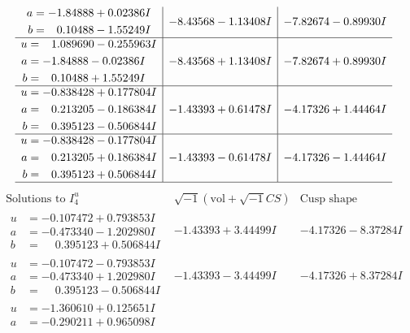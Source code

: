 \documentclass[1p]{elsarticle_modified}
\theoremstyle{definition}
\newcommand{\I}{\sqrt{-1}}
\begin{document}
$$\begin{array}{c|c|c}
\begin{aligned}
a &= -1.84888 + 0.02386 I \\
b &= \phantom{-}0.10488 - 1.55249 I\end{aligned}
 & -8.43568 - 1.13408 I & -7.82674 - 0.89930 I \\ \hline\begin{aligned}
u &= \phantom{-}1.089690 - 0.255963 I \\
a &= -1.84888 - 0.02386 I \\
b &= \phantom{-}0.10488 + 1.55249 I\end{aligned}
 & -8.43568 + 1.13408 I & -7.82674 + 0.89930 I \\ \hline\begin{aligned}
u &= -0.838428 + 0.177804 I \\
a &= \phantom{-}0.213205 - 0.186384 I \\
b &= \phantom{-}0.395123 - 0.506844 I\end{aligned}
 & -1.43393 + 0.61478 I & -4.17326 + 1.44464 I \\ \hline\begin{aligned}
u &= -0.838428 - 0.177804 I \\
a &= \phantom{-}0.213205 + 0.186384 I \\
b &= \phantom{-}0.395123 + 0.506844 I\end{aligned}
 & -1.43393 - 0.61478 I & -4.17326 - 1.44464 I\\
 \hline 
 \end{array}$$\newpage$$\begin{array}{c|c|c}  
\text{Solutions to }I^u_{4}& \I (\text{vol} + \sqrt{-1}CS) & \text{Cusp shape}\\
 \hline 
\begin{aligned}
u &= -0.107472 + 0.793853 I \\
a &= -0.473340 - 1.202980 I \\
b &= \phantom{-}0.395123 + 0.506844 I\end{aligned}
 & -1.43393 + 3.44499 I & -4.17326 - 8.37284 I \\ \hline\begin{aligned}
u &= -0.107472 - 0.793853 I \\
a &= -0.473340 + 1.202980 I \\
b &= \phantom{-}0.395123 - 0.506844 I\end{aligned}
 & -1.43393 - 3.44499 I & -4.17326 + 8.37284 I \\ \hline\begin{aligned}
u &= -1.360610 + 0.125651 I \\
a &= -0.290211 + 0.965098 I \\

\end{aligned}
\end{array}$$
\end{document}
